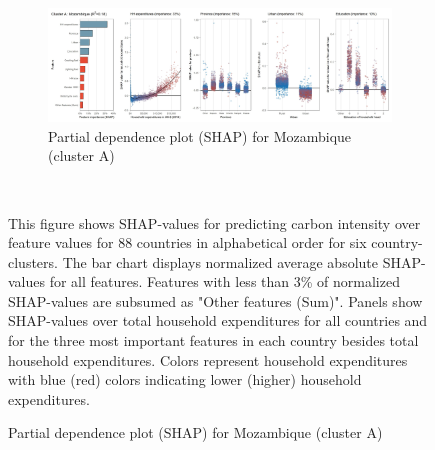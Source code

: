 \begin{figure}[ht!]
    \\
    \vspace{0.5cm}
   \begin{subfigure}[b]{\textwidth}         
         \centering
         \caption{Partial dependence plot (SHAP) for Mozambique (cluster A)}
         \label{fig:5b_MOZ}
         \includegraphics[width=\textwidth]{Figure 5b/Figure_5b_MOZ}
         \end{subfigure}
    \\
    \vspace{0.5cm}
   
    \begin{subcaption2}
     This figure shows SHAP-values for predicting carbon intensity over feature values for 88 countries in alphabetical order for six country-clusters. The bar chart displays normalized average absolute SHAP-values for all features. Features with less than 3\% of normalized SHAP-values are subsumed as "Other features (Sum)". Panels show SHAP-values over total household expenditures for all countries and for the three most important features in each country besides total household expenditures. Colors represent household expenditures with blue (red) colors indicating lower (higher) household expenditures.
     \end{subcaption2}
\end{figure}

